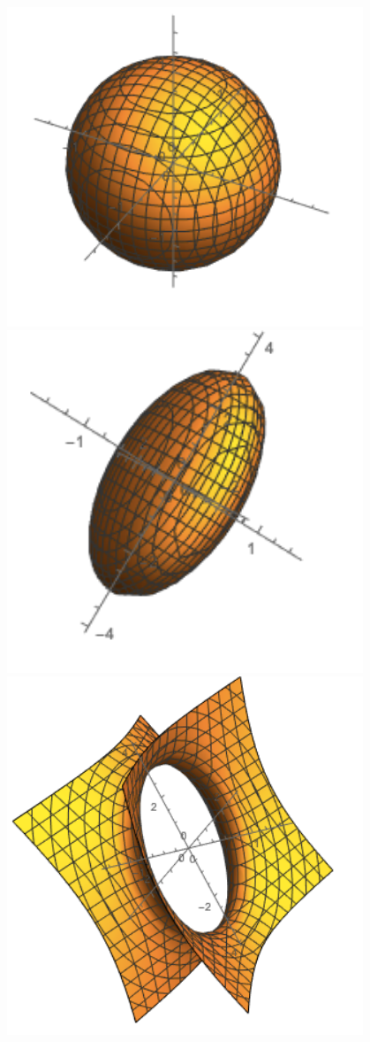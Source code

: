  \begin{marginfigure}
  \includegraphics[width=0.8\textwidth]{figures/qsurf1.png}
  \includegraphics[width=0.8\textwidth]{figures/qsurf2.png}
  \includegraphics[width=0.8\textwidth]{figures/qsurf3.png}

\end{marginfigure}
